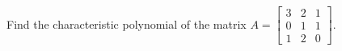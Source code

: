 Find the characteristic polynomial of the matrix 
$A = \begin{bmatrix}  
3 & 2 & 1\\
0 & 1 & 1\\
1 & 2 & 0
\end{bmatrix}$.